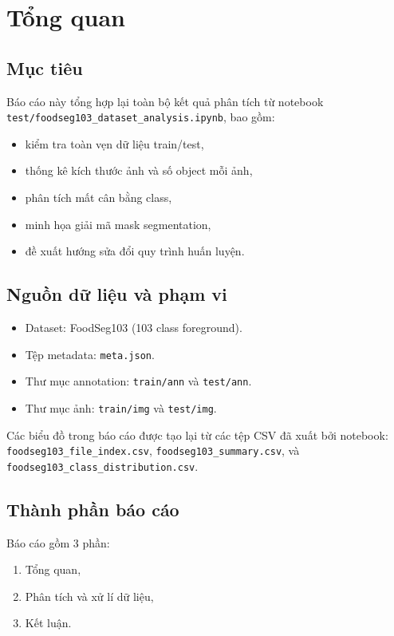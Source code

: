 \section{Tổng quan}

\subsection{Mục tiêu}
Báo cáo này tổng hợp lại toàn bộ kết quả phân tích từ notebook
\texttt{test/foodseg103\_dataset\_analysis.ipynb}, bao gồm:
\begin{itemize}[leftmargin=1.5em]
    \item kiểm tra toàn vẹn dữ liệu train/test,
    \item thống kê kích thước ảnh và số object mỗi ảnh,
    \item phân tích mất cân bằng class,
    \item minh họa giải mã mask segmentation,
    \item đề xuất hướng sửa đổi quy trình huấn luyện.
\end{itemize}

\subsection{Nguồn dữ liệu và phạm vi}
\begin{itemize}[leftmargin=1.5em]
    \item Dataset: FoodSeg103 (103 class foreground).
    \item Tệp metadata: \texttt{meta.json}.
    \item Thư mục annotation: \texttt{train/ann} và \texttt{test/ann}.
    \item Thư mục ảnh: \texttt{train/img} và \texttt{test/img}.
\end{itemize}

Các biểu đồ trong báo cáo được tạo lại từ các tệp CSV đã xuất bởi notebook:
\texttt{foodseg103\_file\_index.csv}, \texttt{foodseg103\_summary.csv},
và \texttt{foodseg103\_class\_distribution.csv}.

\subsection{Thành phần báo cáo}
Báo cáo gồm 3 phần:
\begin{enumerate}[leftmargin=1.5em]
    \item Tổng quan,
    \item Phân tích và xử lí dữ liệu,
    \item Kết luận.
\end{enumerate}
